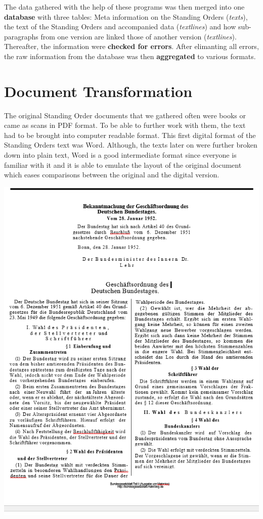 \documentclass[10pt,]{article}
\begin{document}
The data gathered with the help of these programs was then merged into
one \textbf{database} with three tables: Meta information on the
Standing Orders (\emph{texts}), the text of the Standing Orders and
accompanied data (\emph{textlines}) and how sub-paragraphs from one
version are linked those of another version (\emph{textlines}).
Thereafter, the information were \textbf{checked for errors}. After
elimanting all errors, the raw information from the database was then
\textbf{aggregated} to various formats.

\newpage

\section{Document Transformation}\label{document-transformation}

The original Standing Order documents that we gathered often were books
or came as scans in PDF format. To be able to further work with them,
the text had to be brought into computer readable format. This first
digital format of the Standing Orders text was Word. Although, the texts
later on were further broken down into plain text, Word is a good
intermediate format since everyone is familiar with it and it is able to
emulate the layout of the original document which eases comparisons
between the original and the digital version.

\begin{center}
\includegraphics[height=0.7\textheight]{fig/fig1.png}
\end{center}
\end{document}
